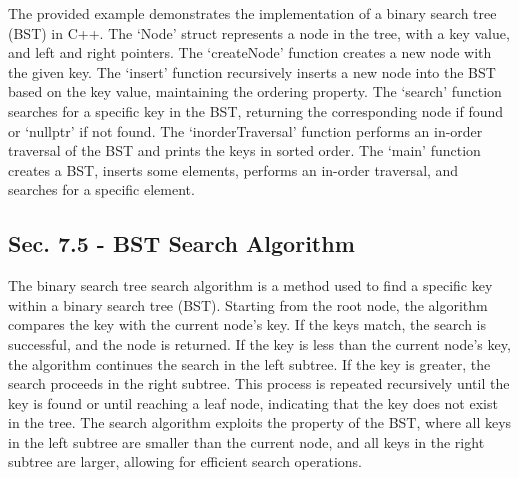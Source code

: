 \begin{solution}
    The provided example demonstrates the implementation of a binary search tree (BST) in C++. The `Node' struct represents a node in the tree, with a key value, and left and right pointers. The `createNode' function creates a new node with the given key. The `insert' function recursively inserts a new node into the BST based on 
    the key value, maintaining the ordering property. The `search' function searches for a specific key in the BST, returning the corresponding node if found or `nullptr' if not found. The `inorderTraversal' function performs an in-order traversal of the BST and prints the keys in sorted order. The `main' function creates a BST, inserts 
    some elements, performs an in-order traversal, and searches for a specific element.
\end{solution}

\subsection*{Sec. 7.5 - BST Search Algorithm}

The binary search tree search algorithm is a method used to find a specific key within a binary search tree (BST). Starting from the root node, the algorithm compares the key with the current node's key. If the keys match, the search is successful, and the node is returned. If the key is less than the current node's key, the algorithm continues 
the search in the left subtree. If the key is greater, the search proceeds in the right subtree. This process is repeated recursively until the key is found or until reaching a leaf node, indicating that the key does not exist in the tree. The search algorithm exploits the property of the BST, where all keys in the left subtree are smaller 
than the current node, and all keys in the right subtree are larger, allowing for efficient search operations.

